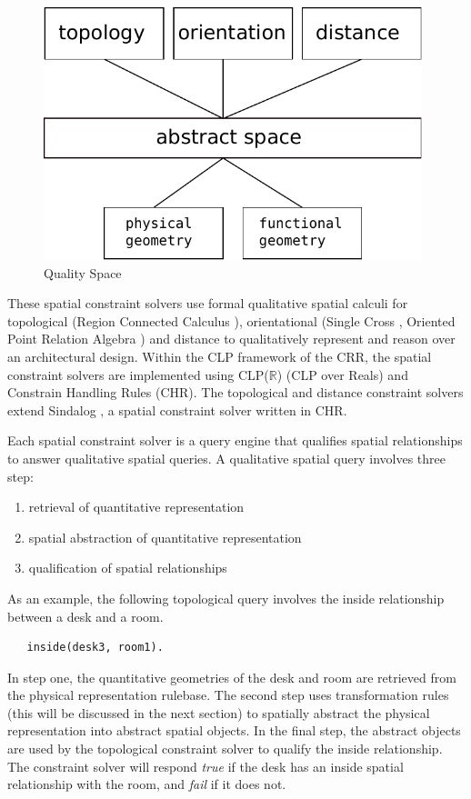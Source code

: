 \documentclass[12pt]{ucthesis}
\begin{document}
\begin{figure}[H]
\centering
\includegraphics[width=110mm]{reasoner-design}
\caption{Quality Space}
\label{reasoner-design}
\end{figure}

These spatial constraint solvers use formal qualitative spatial calculi for topological (Region Connected Calculus \cite{Freksa}), orientational (Single Cross \cite{Freksa}, Oriented Point Relation Algebra \cite{Moratz}) and distance to qualitatively represent and reason over an architectural design. Within the CLP framework of the CRR, the spatial constraint solvers are implemented using CLP($\mathbb{R}$) (CLP over Reals) and Constrain Handling Rules (CHR). The topological and distance constraint solvers extend Sindalog \cite{Sindalog}, a spatial constraint solver written in CHR.

Each spatial constraint solver is a query engine that qualifies spatial relationships to answer qualitative spatial queries.  A qualitative spatial query involves three step:
\begin{enumerate}
\item retrieval of quantitative representation 
\item spatial abstraction of quantitative representation
\item qualification of spatial relationships
\end{enumerate}  
As an example, the following topological query involves the inside relationship between a desk and a room. 
\begin{verbatim}
   inside(desk3, room1).
\end{verbatim} In step one, the quantitative geometries of the desk and room are retrieved from the physical representation rulebase. The second step uses transformation rules (this will be discussed in the next section) to spatially abstract the physical representation into abstract spatial objects. In the final step, the abstract objects are used by the topological constraint solver to qualify the inside relationship. The constraint solver will respond \emph{true} if the desk has an inside spatial relationship with the room, and \emph{fail} if it does not.   
\end{document}
